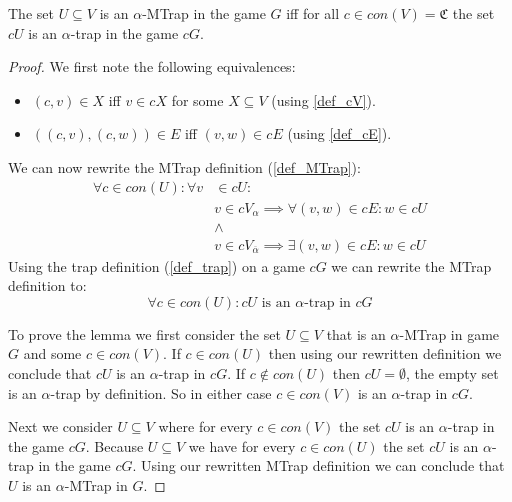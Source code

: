 \begin{lemma}
		\label{lem_MPG_MTrap_is_trap}
	The set $U \subseteq V$ is an $\alpha$-MTrap in the game $G$ iff for all $c \in con(V) = \mathfrak{C}$ the set $cU$ is an $\alpha$-trap in the game $cG$.
	\begin{proof}
		We first note the following equivalences:
		\begin{itemize}
			\item $(c,v) \in X$ iff $v \in cX$ for some $X \subseteq V$ (using \ref{def_cV}).
			\item $((c,v),(c,w)) \in E$ iff $(v,w) \in cE$ (using \ref{def_cE}).
		\end{itemize}
	We can now rewrite the MTrap definition (\ref{def_MTrap}):
	\begin{align*}
	\forall c \in con(U):\forall v &\in cU:\\
	&v \in cV_\alpha \implies \forall(v,w) \in cE : w \in cU\\
	&\wedge\\
	&v \in cV_{\overline{\alpha}} \implies \exists (v,w) \in cE : w \in cU
	\end{align*}
	Using the trap definition (\ref{def_trap}) on a game $cG$ we can rewrite the MTrap definition to:
	\[ \forall c \in con(U): cU\text{ is an $\alpha$-trap in $cG$} \]
	
	To prove the lemma we first consider the set $U \subseteq V$ that is an $\alpha$-MTrap in game $G$ and some $c \in con(V)$. If $c \in con(U)$ then using our rewritten definition we conclude that $cU$ is an $\alpha$-trap in $cG$. If $c \notin con(U)$ then $cU = \emptyset$, the empty set is an $\alpha$-trap by definition. So in either case $c \in con(V)$ is an $\alpha$-trap in $cG$.
	
	Next we consider $U \subseteq V$ where for every $c \in con(V)$ the set $cU$ is an $\alpha$-trap in the game $cG$. Because $U \subseteq V$ we have for every $c \in con(U)$ the set $cU$ is an $\alpha$-trap in the game $cG$. Using our rewritten MTrap definition we can conclude that $U$ is an $\alpha$-MTrap in $G$.
	\end{proof}
\end{lemma}

